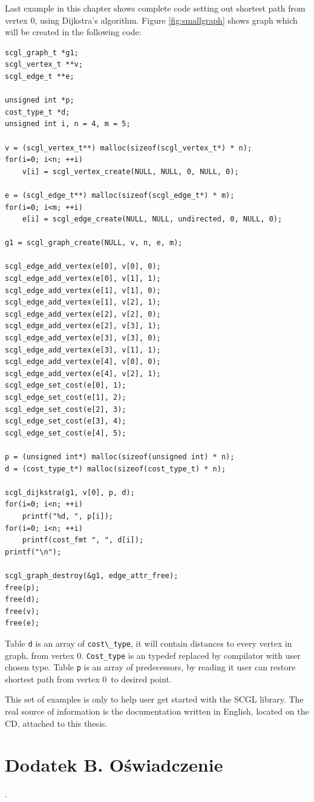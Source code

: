 \documentclass[a4paper,12pt,polish,twoside,openright]{thesis}
\newcommand\code[1]{\lstinline[style=line]{#1}}
\begin{document}
Last example in this chapter shows complete code setting out shortest path from vertex 0, using Dijkstra's algorithm.
Figure \ref{fig:smallgraph} shows graph which will be created in the following code:
\begin{lstlisting}[style=code,caption={Use of Dijkstra's algorithm example}]
scgl_graph_t *g1;
scgl_vertex_t **v;
scgl_edge_t **e;

unsigned int *p;
cost_type_t *d;
unsigned int i, n = 4, m = 5;

v = (scgl_vertex_t**) malloc(sizeof(scgl_vertex_t*) * n);
for(i=0; i<n; ++i)
	v[i] = scgl_vertex_create(NULL, NULL, 0, NULL, 0);

e = (scgl_edge_t**) malloc(sizeof(scgl_edge_t*) * m);
for(i=0; i<m; ++i)
	e[i] = scgl_edge_create(NULL, NULL, undirected, 0, NULL, 0);

g1 = scgl_graph_create(NULL, v, n, e, m);

scgl_edge_add_vertex(e[0], v[0], 0);
scgl_edge_add_vertex(e[0], v[1], 1);
scgl_edge_add_vertex(e[1], v[1], 0);
scgl_edge_add_vertex(e[1], v[2], 1);
scgl_edge_add_vertex(e[2], v[2], 0);
scgl_edge_add_vertex(e[2], v[3], 1);
scgl_edge_add_vertex(e[3], v[3], 0);
scgl_edge_add_vertex(e[3], v[1], 1);
scgl_edge_add_vertex(e[4], v[0], 0);
scgl_edge_add_vertex(e[4], v[2], 1);
scgl_edge_set_cost(e[0], 1);
scgl_edge_set_cost(e[1], 2);
scgl_edge_set_cost(e[2], 3);
scgl_edge_set_cost(e[3], 4);
scgl_edge_set_cost(e[4], 5);

p = (unsigned int*) malloc(sizeof(unsigned int) * n);
d = (cost_type_t*) malloc(sizeof(cost_type_t) * n);

scgl_dijkstra(g1, v[0], p, d);
for(i=0; i<n; ++i)
	printf("%d, ", p[i]);
for(i=0; i<n; ++i)
	printf(cost_fmt ", ", d[i]);
printf("\n");

scgl_graph_destroy(&g1, edge_attr_free);
free(p);
free(d);
free(v);
free(e);
\end{lstlisting}
Table \code{d} is an array of \code{cost\_type}, it will contain distances to every vertex in graph, from vertex 0.
\code{Cost_type} is an typedef replaced by compilator with user chosen type.
Table \code{p} is an array of predecessors, by reading it user can restore shortest path from vertex 0~to desired point.

This set of examples is only to help user get started with the SCGL library.
The real source of information is the documentation written in English, located on the CD, attached to this thesis.

\chapter*{Dodatek B. Oświadczenie}
\newlength{\oldparskip}
\setlength{\oldparskip}{\parskip}
\setlength{\parindent}{0pt}.
\setlength{\parskip}{0.3cm}
\end{document}
